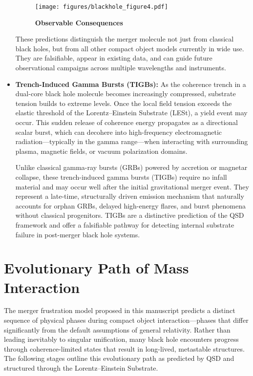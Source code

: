 \documentclass[sn-mathphys]{sn-jnl}
\theoremstyle{thmstyleone}%
\theoremstyle{thmstyletwo}%
\theoremstyle{thmstylethree}%
\begin{document}
\begin{itemize}
\begin{figure}[H]
    \centering
    \texttt{[image: figures/blackhole\_figure4.pdf]}
    \caption{
        \textbf{Observable Consequences}
    }
    \label{fig:consequences}
\end{figure}

These predictions distinguish the merger molecule not just from classical black holes, but from all other compact object models currently in wide use. They are falsifiable, appear in existing data, and can guide future observational campaigns across multiple wavelengths and instruments.

\item \textbf{Trench-Induced Gamma Bursts (TIGBs):}
As the coherence trench in a dual-core black hole molecule becomes increasingly compressed, substrate tension builds to extreme levels. Once the local field tension exceeds the elastic threshold of the Lorentz--Einstein Substrate (LESt), a yield event may occur. This sudden release of coherence energy propagates as a directional scalar burst, which can decohere into high-frequency electromagnetic radiation—typically in the gamma range—when interacting with surrounding plasma, magnetic fields, or vacuum polarization domains.

Unlike classical gamma-ray bursts (GRBs) powered by accretion or magnetar collapse, these trench-induced gamma bursts (TIGBs) require no infall material and may occur well after the initial gravitational merger event. They represent a late-time, structurally driven emission mechanism that naturally accounts for orphan GRBs, delayed high-energy flares, and burst phenomena without classical progenitors. TIGBs are a distinctive prediction of the QSD framework and offer a falsifiable pathway for detecting internal substrate failure in post-merger black hole systems.

\end{itemize}

\section{Evolutionary Path of Mass Interaction}

The merger frustration model proposed in this manuscript predicts a distinct sequence of physical phases during compact object interaction—phases that differ significantly from the default assumptions of general relativity. Rather than leading inevitably to singular unification, many black hole encounters progress through coherence-limited states that result in long-lived, metastable structures. The following stages outline this evolutionary path as predicted by QSD and structured through the Lorentz--Einstein Substrate.
\end{document}
